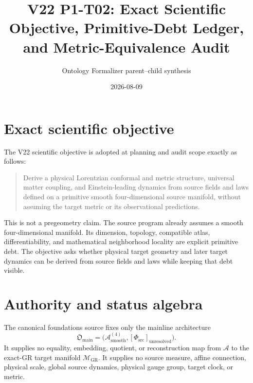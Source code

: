 \documentclass[11pt]{article}
\title{V22 P1-T02: Exact Scientific Objective, Primitive-Debt Ledger,\\
and Metric-Equivalence Audit}
\author{Ontology Formalizer parent--child synthesis}
\date{2026-08-09}
\newcommand{\A}{\mathcal A}
\newcommand{\PhiSrc}{\Phi_{\mathrm{src}}}
\newcommand{\MGR}{\mathcal M_{\mathrm{GR}}}
\begin{document}
\maketitle

\begin{center}
\end{center}

\section{Exact scientific objective}

The V22 scientific objective is adopted at planning and audit scope exactly as
follows:

\begin{quote}
Derive a physical Lorentzian conformal and metric structure, universal matter
coupling, and Einstein-leading dynamics from source fields and laws defined on
a primitive smooth four-dimensional source manifold, without assuming the
target metric or its observational predictions.
\end{quote}

This is not a pregeometry claim. The source program already assumes a smooth
four-dimensional manifold. Its dimension, topology, compatible atlas,
differentiability, and mathematical neighborhood locality are explicit
primitive debt. The objective asks whether physical target geometry and later
target dynamics can be derived from source fields and laws while keeping that
debt visible.

\section{Authority and status algebra}

The canonical foundations source fixes only the mainline architecture
\[
  \mathfrak O_{\mathrm{main}}
  =\bigl(\A^{(4)}_{\mathrm{smooth}},
          [\PhiSrc]_{\mathrm{unresolved}}\bigr).
\]
It supplies no equality, embedding, quotient, or reconstruction map from
\(\A\) to the exact-GR target manifold \(\MGR\). It supplies no source
measure, affine connection, physical scale, global source dynamics, physical
gauge group, target clock, or metric.
\end{document}
